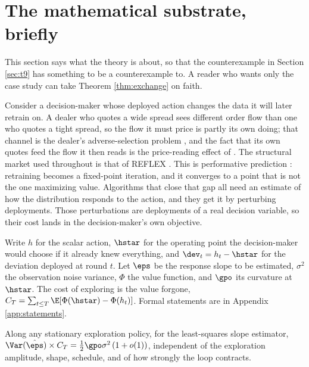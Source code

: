 \documentclass{article}
\begin{document}
\section{The mathematical substrate, briefly}
\label{sec:substrate}

This section says what the theory is about, so that the counterexample in
Section \ref{sec:t9} has something to be a counterexample to. A reader who
wants only the case study can take Theorem \ref{thm:exchange} on faith.

Consider a decision-maker whose deployed action changes the data it will
later retrain on. A dealer who quotes a wide spread sees different order flow
than one who quotes a tight spread, so the flow it must price is partly its
own doing; that channel is the dealer's adverse-selection problem
\citep{gueant2013inventory}, and the fact that its own quotes feed the flow it
then reads is the price-reading effect of \citet{barzykin2026quoting}. The
structural market used throughout is that of REFLEX \citep{reflex2026}. This
is performative prediction
\citep{perdomo2020performative,hardt2023performative}: retraining becomes a
fixed-point iteration, and it converges to a point that is not the one
maximizing value. Algorithms that close that gap
\citep{izzo2021learn,miller2021outside,mendler2020stochastic,drusvyatskiy2022stochastic,li2022state,brown2022performative}
all need an estimate of how the distribution responds to the action, and they
get it by perturbing deployments. Those perturbations are deployments of a real
decision variable, so their cost lands in the decision-maker's own objective.

Write $h$ for the scalar action, $\hstar$ for the operating point the
decision-maker would choose if it already knew everything, and
$\dev_t = h_t - \hstar$ for the deviation deployed at round $t$. Let $\eps$
be the response slope to be estimated, $\sigma^2$ the observation noise
variance, $\Phi$ the value function, and $\gpo$ its curvature at $\hstar$.
The cost of exploring is the value forgone,
$C_T = \sum_{t \le T}\E[\Phi(\hstar) - \Phi(h_t)]$. Formal statements are in
Appendix \ref{app:statements}.

\begin{theorem}
\label{thm:exchange}
Along any stationary exploration policy, for the least-squares slope
estimator,
$\Var(\hat\eps)\times C_T = \tfrac{1}{2}\gpo\sigma^2\,(1 + o(1))$,
independent of the exploration amplitude, shape, schedule, and of how
strongly the loop contracts.
\end{theorem}
\end{document}
